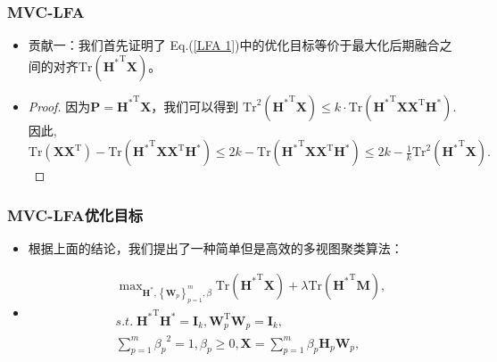 \begin{frame}
    \frametitle{MVC-LFA}
    \begin{itemize}
        \item 贡献一：我们首先证明了 Eq.(\ref{LFA 1})中的优化目标等价于最大化后期融合之间的对齐$\mathrm{Tr} ({\mathbf{H}^*}^{ \mathrm{ T }} \mathbf{X})$。
        \item
 \begin{proof}
因为$\mathbf{P} = {\mathbf{H}^*}^{ \mathrm{ T }} \mathbf{X}$，我们可以得到 $\mathrm{Tr}^2 ({\mathbf{H}^*}^{ \mathrm{ T }} \mathbf{X}) \leq k \cdot  \mathrm{Tr}({\mathbf{H}^*}^{ \mathrm{ T }} \mathbf{X} \mathbf{X}^{\mathrm{ T }}{\mathbf{H}^*} )$.
因此,
$
\mathrm{Tr}(\mathbf{X} \mathbf{X}^{\mathrm{ T }}) - \mathrm{Tr} ( {\mathbf{H}^*}^{\mathrm{ T }} \mathbf{X} \mathbf{X}^{\mathrm{ T }} \mathbf{H}^*) \leq 2k - \mathrm{Tr} ( {\mathbf{H}^*}^{\mathrm{ T }} \mathbf{X} \mathbf{X}^{\mathrm{ T }} \mathbf{H}^*) \leq  2k - \frac{1}{k} \mathrm{Tr}^2 ({\mathbf{H}^*}^{ \mathrm{ T }} \mathbf{X}).
$
\end{proof}
    \end{itemize} 
    
      
\end{frame}

\begin{frame}
    \frametitle{MVC-LFA优化目标}
    \begin{itemize}
        \item 根据上面的结论，我们提出了一种简单但是高效的多视图聚类算法：
        \item \begin{equation}
\label{LFA 2}
\begin{split}
\;&\;\max\nolimits_{\mathbf{H}^*,\left\{\mathbf{W}_p\right\}_{p=1}^m,\beta} \mathrm{Tr} ({\mathbf{H}^*}^{ \mathrm{ T }} \mathbf{X}) + \lambda \mathrm{Tr}({\mathbf{H}^*}^{ \mathrm{ T }} \mathbf{M}),\\
\;&\; s.t.\;{\mathbf{H}^*}^{ \mathrm{ T }}\mathbf{H}^* = \mathbf{I}_k, \mathbf{{W}}_p^{ \mathrm{ T }}\mathbf{W}_p = \mathbf{I}_k,\\
\;&\;\sum\nolimits_{p=1}^m {\beta_{p}}^2 = 1, \beta_{p} \geq 0,\mathbf{X}= \sum\nolimits_{p=1}^m \beta_p \mathbf{H}_p \mathbf{W}_p,
\end{split}
\end{equation}
    \end{itemize} 
  
      
\end{frame}

